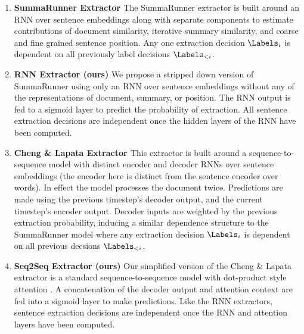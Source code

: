 \begin{enumerate}

    \item \textbf{SummaRunner Extractor \cite{nallapati2016summarunner}} 
      The SummaRunner extractor is built 
      around an RNN over sentence embeddings along 
      with separate components to estimate contributions of document 
      similarity, iterative summary similarity, and coarse and fine grained 
      sentence position. Any one extraction decision $\Labels_i$ is 
      dependent on all previously label decisions $\Labels_{<i}$.
  \item \textbf{RNN Extractor (ours)} We propose a stripped down version
      of SummaRunner using only an RNN over sentence embeddings 
      without any of the  representations of document, summary,
      or position. The RNN output is fed to a sigmoid layer to predict the
      probability of extraction. All sentence extraction decisions are
      independent once the hidden layers of the RNN have been computed. 
  \item \textbf{Cheng \& Lapata Extractor \cite{cheng2016neural}}
      This extractor is built around a sequence-to-sequence model with 
      distinct encoder and decoder RNNs over sentence embeddings (the encoder
      here is distinct from the sentence encoder over words).
      In effect the model processes the document twice. Predictions are 
      made using the previous timestep's decoder output, and the current 
      timestep's encoder output. Decoder inputs are weighted by the previous
      extraction probability, inducing a similar dependence structure 
      to the SummaRunner model where any extraction decision $\Labels_i$
      is dependent on all previous decsions $\Labels_{<i}$.
 \item \textbf{Seq2Seq Extractor (ours)} Our simplified version of the 
     Cheng \& Lapata extractor is a standard sequence-to-sequence model
     \cite{bahdanau2014neural} with dot-product style attention
     \cite{luong2015effective}. A concatenation of the decoder output and 
     attention context are fed into a sigmoid layer to make predictions.
     Like the RNN extractors, sentence extraction decisions are
      independent once the RNN and attention layers have been computed.
\end{enumerate}


